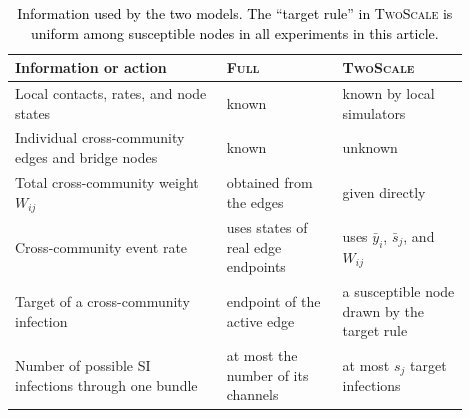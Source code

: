 \documentclass[a4paper,fleqn]{cas-sc}
\newcommand{\ibar}{\bar{y}}
\newcommand{\sbar}{\bar{s}}
\newcommand{\Full}{\textup{\textsc{Full}}}
\newcommand{\TS}{\textup{\textsc{TwoScale}}}
\begin{document}
\begin{table}[tbp]
\color{black}
\centering
\caption{\textcolor{black}{Information used by the two models. The ``target rule'' in \TS{} is uniform among susceptible nodes in all experiments in this article.}}
\label{tab:information}
\small
\begin{tabular}{>{\raggedright\arraybackslash}p{0.42\linewidth}>{\raggedright\arraybackslash}p{0.23\linewidth}>{\raggedright\arraybackslash}p{0.25\linewidth}}
\toprule
Information or action & \Full{} & \TS{}\\
\midrule
Local contacts, rates, and node states & known & known by local simulators\\
Individual cross-community edges and bridge nodes & known & unknown\\
Total cross-community weight $W_{ij}$ & obtained from the edges & given directly\\
Cross-community event rate & uses states of real edge endpoints & uses $\ibar_i$, $\sbar_j$, and $W_{ij}$\\
Target of a cross-community infection & endpoint of the active edge & a susceptible node drawn by the target rule\\
Number of possible SI infections through one bundle & at most the number of its channels & at most $s_j$ target infections\\
\bottomrule
\end{tabular}
\end{table}
\end{document}
